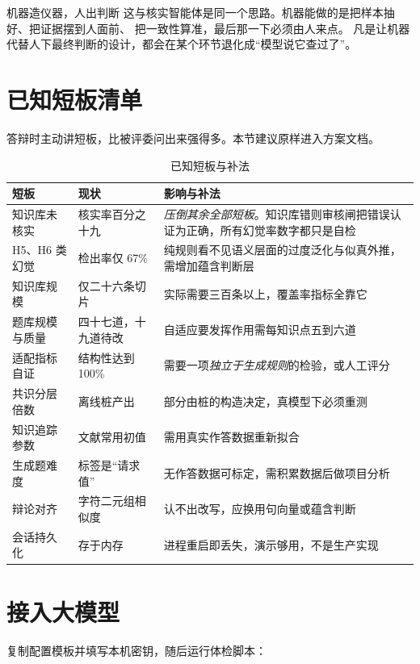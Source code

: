 \begin{keynote}{机器造仪器，人出判断}
这与核实智能体是同一个思路。机器能做的是把样本抽好、把证据摆到人面前、
把一致性算准，最后那一下必须由人来点。
凡是让机器代替人下最终判断的设计，都会在某个环节退化成“模型说它查过了”。
\end{keynote}

\section{已知短板清单}

答辩时主动讲短板，比被评委问出来强得多。本节建议原样进入方案文档。

\begin{table}[htbp]\centering\small
\caption{已知短板与补法}\label{tab:gaps}
\begin{tabular}{@{}p{2.4cm}p{3.4cm}p{6.2cm}@{}}
\toprule
短板 & 现状 & 影响与补法 \\
\midrule
知识库未核实 & 核实率百分之十九 & \emph{压倒其余全部短板}。知识库错则审核闸把错误认证为正确，所有幻觉率数字都只是自检 \\
H5、H6 类幻觉 & 检出率仅 67\% & 纯规则看不见语义层面的过度泛化与似真外推，需增加蕴含判断层 \\
知识库规模 & 仅二十六条切片 & 实际需要三百条以上，覆盖率指标全靠它 \\
题库规模与质量 & 四十七道，十九道待改 & 自适应要发挥作用需每知识点五到六道 \\
适配指标自证 & 结构性达到 100\% & 需要一项\emph{独立于生成规则}的检验，或人工评分 \\
共识分层倍数 & 离线桩产出 & 部分由桩的构造决定，真模型下必须重测 \\
知识追踪参数 & 文献常用初值 & 需用真实作答数据重新拟合 \\
生成题难度 & 标签是“请求值” & 无作答数据可标定，需积累数据后做项目分析 \\
辩论对齐 & 字符二元组相似度 & 认不出改写，应换用句向量或蕴含判断 \\
会话持久化 & 存于内存 & 进程重启即丢失，演示够用，不是生产实现 \\
\bottomrule
\end{tabular}
\end{table}

\section{接入大模型}

复制配置模板并填写本机密钥，随后运行体检脚本：


